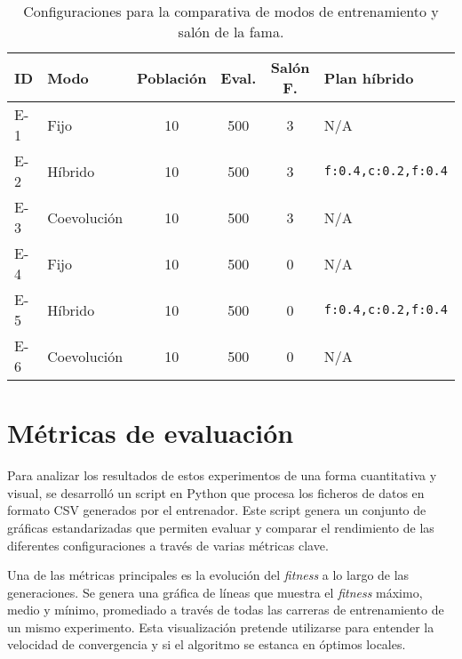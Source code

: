 \begin{table}[H]
	\centering
	\caption{Configuraciones para la comparativa de modos de entrenamiento y salón de la fama.}
	\label{tab:main_experiments}
	\begin{tabular}{@{}llcccl@{}}
		\toprule
		\textbf{ID} & \textbf{Modo} & \textbf{Población} & \textbf{Eval.} & \textbf{Salón F.} & \textbf{Plan híbrido}      \\ \midrule
		E-1         & Fijo          & 10                 & 500            & 3                 & N/A                        \\
		E-2         & Híbrido       & 10                 & 500            & 3                 & \texttt{f:0.4,c:0.2,f:0.4} \\
		E-3         & Coevolución   & 10                 & 500            & 3                 & N/A                        \\
		\midrule
		E-4         & Fijo          & 10                 & 500            & 0                 & N/A                        \\
		E-5         & Híbrido       & 10                 & 500            & 0                 & \texttt{f:0.4,c:0.2,f:0.4} \\
		E-6         & Coevolución   & 10                 & 500            & 0                 & N/A                        \\ \bottomrule
	\end{tabular}
\end{table}

\section{Métricas de evaluación} \label{sec:metricas_evaluacion}

Para analizar los resultados de estos experimentos de una forma cuantitativa y visual, se desarrolló un script en Python que procesa los ficheros de datos en formato CSV generados por el entrenador. Este script genera un conjunto de gráficas estandarizadas que permiten evaluar y comparar el rendimiento de las diferentes configuraciones a través de varias métricas clave.

Una de las métricas principales es la evolución del \textit{fitness} a lo largo de las generaciones. Se genera una gráfica de líneas que muestra el \textit{fitness} máximo, medio y mínimo, promediado a través de todas las carreras de entrenamiento de un mismo experimento. Esta visualización pretende utilizarse para entender la velocidad de convergencia y si el algoritmo se estanca en óptimos locales.

